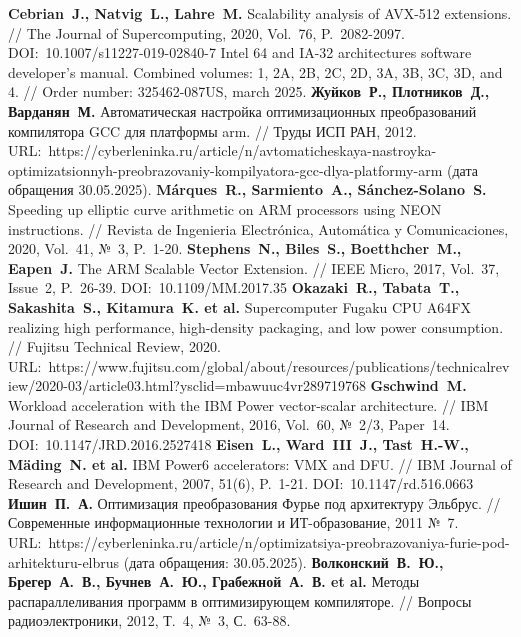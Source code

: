 \begin{thebibliography}{99}



%
\textbf{Cebrian~J., Natvig~L., Lahre~M.} Scalability analysis of AVX-512 extensions. // The Journal of Supercomputing, 2020, Vol.~76, P.~2082-2097. DOI:~10.1007/s11227-019-02840-7
%
Intel 64 and IA-32 architectures software developer's manual. Combined volumes: 1, 2A, 2B, 2C, 2D, 3A, 3B, 3C, 3D, and 4. // Order number: 325462-087US, march 2025.
%
\textbf{Жуйков~Р., Плотников~Д., Варданян~М.} Автоматическая настройка оптимизационных преобразований компилятора GCC для платформы arm. // Труды ИСП РАН, 2012. URL:~https://cyberleninka.ru/article/n/avtomaticheskaya-nastroyka-optimizatsionnyh-preobrazovaniy-kompilyatora-gcc-dlya-platformy-arm (дата обращения 30.05.2025).
%
\textbf{M{\'a}rques~R., Sarmiento~A., S{\'a}nchez-Solano~S.} Speeding up elliptic curve arithmetic on ARM processors using NEON instructions. // Revista de Ingenieria Electr{\'o}nica, Autom{\'a}tica y Comunicaciones, 2020, Vol.~41, №~3, P.~1-20.
%
\textbf{Stephens~N., Biles~S., Boetthcher~M., Eapen~J.} The ARM Scalable Vector Extension. // IEEE Micro, 2017, Vol.~37, Issue~2, P.~26-39. DOI:~10.1109/MM.2017.35
%
\textbf{Okazaki~R., Tabata~T., Sakashita~S., Kitamura~K. et al.} Supercomputer Fugaku CPU A64FX realizing high performance, high-density packaging, and low power consumption. // Fujitsu Technical Review, 2020. URL:~https://www.fujitsu.com/global/about/resources/publications/technicalreview/2020-03/article03.html?ysclid=mbawuuc4vr289719768
%
\textbf{Gschwind~M.} Workload acceleration with the IBM Power vector-scalar architecture. // IBM Journal of Research and Development, 2016, Vol.~60, №~2/3, Paper~14. DOI:~10.1147/JRD.2016.2527418
%
\textbf{Eisen~L., Ward~III~J., Tast~H.-W., M{\"a}ding~N. et al.} IBM Power6 accelerators: VMX and DFU. // IBM Journal of Research and Development, 2007, 51(6), P.~1-21. DOI:~10.1147/rd.516.0663
%
\textbf{Ишин~П.~А.} Оптимизация преобразования Фурье под архитектуру Эльбрус. // Современные информационные технологии и ИТ-образование, 2011 №~7. URL:~https://cyberleninka.ru/article/n/optimizatsiya-preobrazovaniya-furie-pod-arhitekturu-elbrus (дата обращения: 30.05.2025).
%
\textbf{Волконский~В.~Ю., Брегер~А.~В., Бучнев~А.~Ю., Грабежной~А.~В. et al.} Методы распараллеливания программ в оптимизирующем компиляторе. // Вопросы радиоэлектроники, 2012, Т.~4, №~3, С.~63-88.

\end{thebibliography}
